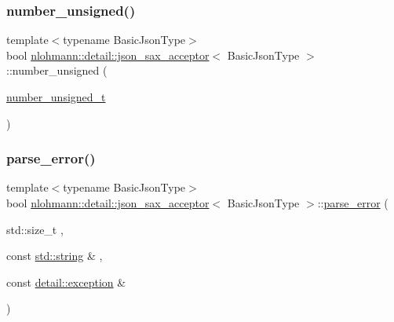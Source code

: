 \subsubsection{\texorpdfstring{number\+\_\+unsigned()}{number\_unsigned()}}
{\footnotesize\ttfamily template$<$typename Basic\+Json\+Type$>$ \\
bool \hyperlink{classnlohmann_1_1detail_1_1json__sax__acceptor}{nlohmann\+::detail\+::json\+\_\+sax\+\_\+acceptor}$<$ Basic\+Json\+Type $>$\+::number\+\_\+unsigned (\begin{DoxyParamCaption}\item[{\hyperlink{classnlohmann_1_1detail_1_1json__sax__acceptor_ae07454608ea6f3cfb765f95e3c850043}{number\+\_\+unsigned\+\_\+t}}]{ }\end{DoxyParamCaption})\hspace{0.3cm}{\ttfamily [inline]}}

\mbox{\label{classnlohmann_1_1detail_1_1json__sax__acceptor_a95bb3e8b6feaa523ecda8106fb5e38e3}} 
\subsubsection{\texorpdfstring{parse\+\_\+error()}{parse\_error()}}
{\footnotesize\ttfamily template$<$typename Basic\+Json\+Type$>$ \\
bool \hyperlink{classnlohmann_1_1detail_1_1json__sax__acceptor}{nlohmann\+::detail\+::json\+\_\+sax\+\_\+acceptor}$<$ Basic\+Json\+Type $>$\+::\hyperlink{classnlohmann_1_1detail_1_1parse__error}{parse\+\_\+error} (\begin{DoxyParamCaption}\item[{std\+::size\+\_\+t}]{,  }\item[{const \hyperlink{namespacenlohmann_1_1detail_a1ed8fc6239da25abcaf681d30ace4985ab45cffe084dd3d20d928bee85e7b0f21}{std\+::string} \&}]{,  }\item[{const \hyperlink{classnlohmann_1_1detail_1_1exception}{detail\+::exception} \&}]{ }\end{DoxyParamCaption})\hspace{0.3cm}{\ttfamily [inline]}}

\mbox{\label{classnlohmann_1_1detail_1_1json__sax__acceptor_a8238e8090cbb4ed8a22cbc97bfb833a5}} 
